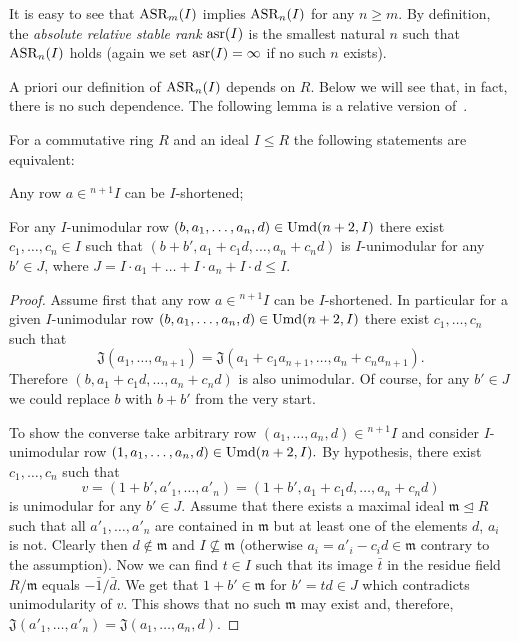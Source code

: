 It is easy to see that $\operatorname{ASR}_m(I)$ implies $\operatorname{ASR}_n(I)$ for any $n\geqslant m$. 
By definition, the \emph{absolute relative stable rank} $\operatorname{asr}(I)$ is the smallest natural $n$ such that $\operatorname{ASR}_n(I)$ holds (again we set $\operatorname{asr}(I)=\infty$ if no such $n$ exists).

A priori our definition of $\operatorname{ASR}_n(I)$ depends on $R$.
Below we will see that, in fact, there is no such dependence.
The following lemma is a relative version of~\cite[Lemma~8.2]{MKV}. 
\begin{lemma}\label{lemma:relative-asr-unimod}
For a commutative ring $R$ and an ideal $I \leq R$ the following statements are equivalent:
\begin{lemlist} 
\item\label{asr-j-stable} Any row $a\in{}^{n+1}\!I$ can be $I$-shortened;
\item\label{asr-bak-like} For any $I$-unimodular row $(b,a_1,\ldots,a_n,d)\in\operatorname{Umd}(n+2,I)$ there exist $c_1,\ldots,c_n\in I$ 
 such that $(b+b',a_1+c_1d,\ldots,a_n+c_nd)$ is $I$-unimodular for any $b'\in J$, where $J=I \cdot a_1 + \ldots + I \cdot a_n + I \cdot d\leq I$.
\end{lemlist} 
\end{lemma}
\begin{proof}
Assume first that any row $a\in{}^{n+1}\!I$ can be $I$-shortened. 
In particular for a given $I$-unimodular row $(b,a_1,\ldots,a_n,d)\in\operatorname{Umd}(n+2,I)$ there exist $c_1,\ldots,c_n$ such that
\[\mathfrak{J}(a_1,\ldots,a_{n+1})=\mathfrak{J}(a_1+c_1a_{n+1},\ldots,a_n+c_na_{n+1}).\]
Therefore $(b,a_1+c_1d,\ldots,a_n+c_nd)$ is also unimodular. Of course, for any $b'\in J$ we could replace $b$ with $b+b'$ from the very start.

To show the converse take arbitrary row $(a_1,\ldots,a_n,d)\in{}^{n+1}\!I$ and consider $I$-unimodular row $(1,a_1,\ldots,a_n,d)\in\operatorname{Umd}(n+2,I).$
By hypothesis, there exist $c_1,\ldots,c_n$ such that \[ v=(1+b',a'_1,\ldots,a'_n)=(1+b',a_1+c_1d,\ldots,a_n+c_nd) \] is unimodular for any $b'\in J$.
Assume that there exists a maximal ideal $\mathfrak{m}\trianglelefteq R$ such that all $a'_1,\ldots,a'_n$ are contained in $\mathfrak{m}$ but at least one of the elements $d$, $a_i$ is not.
Clearly then $d\notin\mathfrak{m}$ and $I\not\subseteq \mathfrak{m}$ (otherwise $a_i=a'_i-c_id\in\mathfrak{m}$ contrary to the assumption).
Now we can find $t\in I$ such that its image $\bar{t}$ in the residue field $R/\mathfrak{m}$ equals $-\bar{1}/\bar{d}$.
We get that $1 + b' \in \mathfrak{m}$ for $b'=td\in J$ which contradicts unimodularity of $v$.
This shows that no such $\mathfrak{m}$ may exist and, therefore, $\mathfrak{J}(a'_1,\ldots,a'_n)=\mathfrak{J}(a_1,\ldots,a_n,d)$.
\end{proof}

